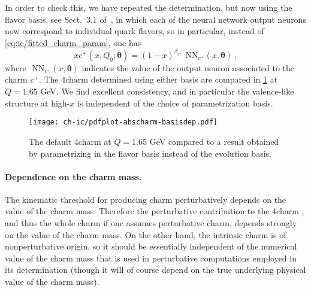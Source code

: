 In order to check this, we have repeated the \pdf determination, but
now using the flavor basis, see Sect.~3.1 of~\cite{Ball:2021leu}, in which
each of the  neural network output neurons now correspond to individual quark
flavors, so in particular,
instead of \cref{eq:ic/fitted_charm_param},  one has
\begin{equation}
\label{eq:ic/fitted_charm_param_flavour}
xc^+(x,Q_0;{\boldsymbol \theta}) =
 (1-x)^{\beta_{c^+}} \textrm{ NN}_{c^+}(x,{\boldsymbol \theta}) \, ,
\end{equation}
where $\textrm{ NN}_{c^+}(x,{\boldsymbol \theta})$
indicates the value of the output neuron associated to the charm \pdf $c^+$.
%
The 4\fns charm \pdfs determined using either basis are compared 
in \cref{fig:ic/charm_basisdep}  at $Q=1.65$ GeV.
%
We find excellent consistency, and in particular 
the valence-like structure at high-$x$ is independent of the choice
of parametrization basis.

\begin{figure}[t!]
  \begin{center}
    \texttt{[image: ch-ic/pdfplot-abscharm-basisdep.pdf]}
    \caption{\small The default 4\fns charm \pdf at $Q=1.65$ GeV
    compared to a result obtained by parametrizing \pdfs in the flavor
    basis instead of the evolution basis. 
  \label{fig:ic/charm_basisdep} }
\end{center}
\end{figure}

\paragraph{Dependence on the charm mass.}
%
The kinematic threshold for producing charm perturbatively depends on
the value of the charm mass. Therefore the perturbative contribution
to the 4\fns charm \pdf, and thus the whole charm \pdf if one assumes
perturbative charm, depends strongly on the value of the charm
mass.
On the other hand, the intrinsic charm \pdf is of nonperturbative
origin, so it should be essentially independent of the numerical value of the
charm mass that is used in  perturbative computations employed in  its 
determination (though it will of course depend on the true underlying 
physical value of the charm mass).

